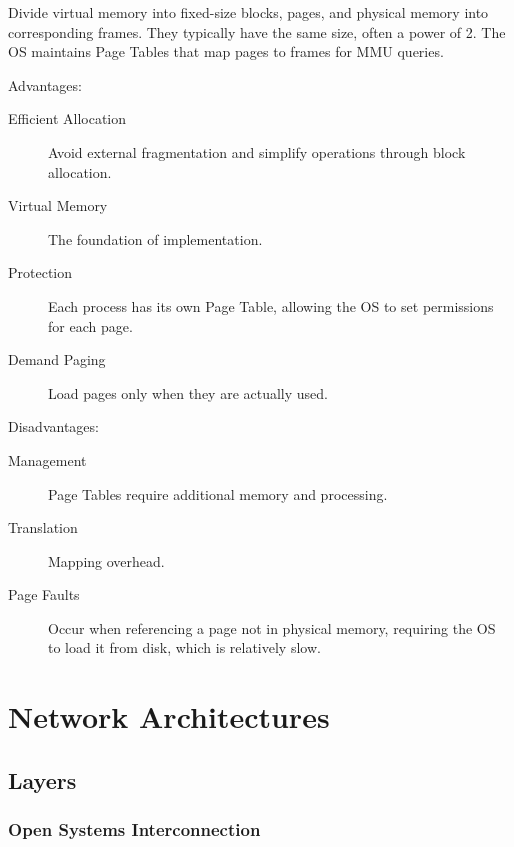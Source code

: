 \documentclass[11pt,journal,compsoc]{IEEEtran}
\begin{document}
Divide virtual memory into fixed-size blocks, pages, and physical memory into corresponding frames. They typically have the same size, often a power of 2. The OS maintains Page Tables that map pages to frames for MMU queries.

Advantages:

\begin{description}
    \item[Efficient Allocation] Avoid external fragmentation and simplify operations through block allocation.
    
    \item[Virtual Memory] The foundation of implementation.
    
    \item[Protection] Each process has its own Page Table, allowing the OS to set permissions for each page.
    
    \item[Demand Paging] Load pages only when they are actually used.
\end{description}

Disadvantages:

\begin{description}
    \item[Management] Page Tables require additional memory and processing.
    
    \item[Translation] Mapping overhead.
    
    \item[Page Faults] Occur when referencing a page not in physical memory, requiring the OS to load it from disk, which is relatively slow.
\end{description}


\section{Network Architectures}


\subsection{Layers}


\subsubsection{Open Systems Interconnection}
\end{document}
